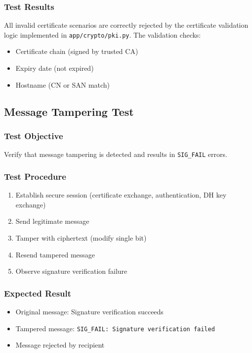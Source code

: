 \documentclass[runningheads]{llncs}
\begin{document}
\subsubsection{Test Results}

All invalid certificate scenarios are correctly rejected by the certificate validation logic implemented in \texttt{app/crypto/pki.py}. The validation checks:
\begin{itemize}
    \item Certificate chain (signed by trusted CA)
    \item Expiry date (not expired)
    \item Hostname (CN or SAN match)
\end{itemize}

\subsection{Message Tampering Test}

\subsubsection{Test Objective}

Verify that message tampering is detected and results in \texttt{SIG\_FAIL} errors.

\subsubsection{Test Procedure}

\begin{enumerate}
    \item Establish secure session (certificate exchange, authentication, DH key exchange)
    \item Send legitimate message
    \item Tamper with ciphertext (modify single bit)
    \item Resend tampered message
    \item Observe signature verification failure
\end{enumerate}

\subsubsection{Expected Result}

\begin{itemize}
    \item Original message: Signature verification succeeds
    \item Tampered message: \texttt{SIG\_FAIL: Signature verification failed}
    \item Message rejected by recipient
\end{itemize}
\end{document}

